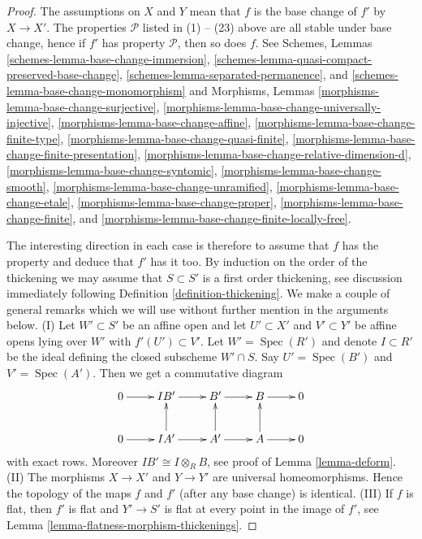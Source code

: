 \documentclass[10pt,a4paper]{amsart}
\theoremstyle{plain}
\theoremstyle{definition}
\theoremstyle{remark}
\numberwithin{equation}{subsection}
\def\Spec{\mathop{\mathrm{Spec}}}
\begin{document}
\begin{proof}
The assumptions on $X$ and $Y$ mean that $f$ is the base change of
$f'$ by $X \to X'$.
The properties $\mathcal{P}$ listed in (1) -- (23) above are all stable
under base change, hence if $f'$ has property $\mathcal{P}$, then so
does $f$. See
Schemes, Lemmas \ref{schemes-lemma-base-change-immersion},
\ref{schemes-lemma-quasi-compact-preserved-base-change},
\ref{schemes-lemma-separated-permanence}, and
\ref{schemes-lemma-base-change-monomorphism}
and
Morphisms, Lemmas
\ref{morphisms-lemma-base-change-surjective},
\ref{morphisms-lemma-base-change-universally-injective},
\ref{morphisms-lemma-base-change-affine},
\ref{morphisms-lemma-base-change-finite-type},
\ref{morphisms-lemma-base-change-quasi-finite},
\ref{morphisms-lemma-base-change-finite-presentation},
\ref{morphisms-lemma-base-change-relative-dimension-d},
\ref{morphisms-lemma-base-change-syntomic},
\ref{morphisms-lemma-base-change-smooth},
\ref{morphisms-lemma-base-change-unramified},
\ref{morphisms-lemma-base-change-etale},
\ref{morphisms-lemma-base-change-proper},
\ref{morphisms-lemma-base-change-finite}, and
\ref{morphisms-lemma-base-change-finite-locally-free}.

\medskip\noindent
The interesting direction in each case is therefore to assume
that $f$ has the property and deduce that $f'$ has it too.
By induction on the order of the thickening we may
assume that $S \subset S'$ is a first order thickening, see
discussion immediately following
Definition \ref{definition-thickening}.
We make a couple of general remarks which we will use without further
mention in the arguments below.
(I) Let $W' \subset S'$ be an affine open and let $U' \subset X'$
and $V' \subset Y'$ be affine opens lying over $W'$ with $f'(U') \subset V'$.
Let $W' = \Spec(R')$ and denote $I \subset R'$ be the ideal
defining the closed subscheme $W' \cap S$. Say $U' = \Spec(B')$
and $V' = \Spec(A')$. Then we get a commutative diagram
$$
\xymatrix{
0 \ar[r] &
IB' \ar[r] &
B' \ar[r] &
B \ar[r] & 0 \\
0 \ar[r] &
IA' \ar[r] \ar[u] &
A' \ar[r] \ar[u] &
A \ar[r] \ar[u] & 0
}
$$
with exact rows. Moreover $IB' \cong I \otimes_R B$, see proof of
Lemma \ref{lemma-deform}.
(II) The morphisms $X \to X'$ and $Y \to Y'$ are universal homeomorphisms.
Hence the topology of the maps $f$ and $f'$ (after any base change)
is identical. (III) If $f$ is flat, then $f'$ is flat and
$Y' \to S'$ is flat at every point in the image of $f'$, see
Lemma \ref{lemma-flatness-morphism-thickenings}.


\end{proof}
\end{document}
